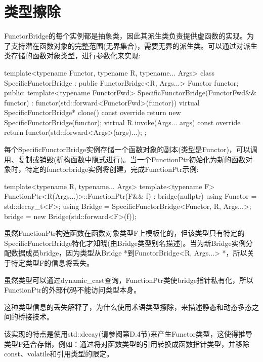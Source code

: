 \section{类型擦除}
FunctorBridge的每个实例都是抽象类，因此其派生类负责提供虚函数的实现。为了支持潜在函数对象的完整范围(无界集合)，需要无界的派生类。可以通过对派生类存储的函数对象类型，进行参数化来实现:

\begin{cpp}
template<typename Functor, typename R, typename... Args>
class SpecificFunctorBridge : public FunctorBridge<R, Args...> {
	Functor functor;
	public:
	template<typename FunctorFwd>
	SpecificFunctorBridge(FunctorFwd&& functor)
	: functor(std::forward<FunctorFwd>(functor)) {
	}
	virtual SpecificFunctorBridge* clone() const override {
		return new SpecificFunctorBridge(functor);
	}
	virtual R invoke(Args... args) const override {
		return functor(std::forward<Args>(args)...);
	}
};
\end{cpp}

每个SpecificFunctorBridge实例存储一个函数对象的副本(类型是Functor)，可以调用、复制或销毁(析构函数中隐式进行)。当一个FunctionPtr初始化为新的函数对象时，特定的functorbridge实例将创建，完成FunctionPtr示例:

\begin{cpp}
template<typename R, typename... Args>
template<typename F>
FunctionPtr<R(Args...)>::FunctionPtr(F&& f)
: bridge(nullptr)
{
	using Functor = std::decay_t<F>;
	using Bridge = SpecificFunctorBridge<Functor, R, Args...>;
	bridge = new Bridge(std::forward<F>(f));
}
\end{cpp}

虽然FunctionPtr构造函数在函数对象类型F上模板化的，但该类型只有特定的SpecificFunctorBridge特化才知晓(由Bridge类型别名描述)。当为新Bridge实例分配数据成员bridge，因为类型从Bridge *到FunctorBridge<R, Args...> *，所以关于特定类型F的信息将丢失。

\begin{notice}
虽然类型可以通过dynamic\_cast查询，FunctionPtr类使bridge指针私有化，所以FunctionPtr的外部代码不能访问类型本身。
\end{notice}

这种类型信息的丢失解释了，为什么使用术语类型擦除，来描述静态和动态多态之间的桥接技术。

该实现的特点是使用std::decay(请参阅第D.4节)来产生Functor类型，这使得推导类型F适合存储，例如：通过将对函数类型的引用转换成函数指针类型，并移除const、volatile和引用类型的限定。








































